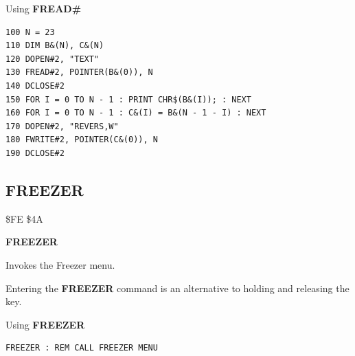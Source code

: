 \begin{description}[leftmargin=2cm,style=nextline]
\item [Example:]  Using {\bf FREAD\#}

\begin{tcolorbox}[colback=black,coltext=white]
\verbatimfont{\codefont}
\begin{verbatim}
100 N = 23
110 DIM B&(N), C&(N)
120 DOPEN#2, "TEXT"
130 FREAD#2, POINTER(B&(0)), N
140 DCLOSE#2
150 FOR I = 0 TO N - 1 : PRINT CHR$(B&(I)); : NEXT
160 FOR I = 0 TO N - 1 : C&(I) = B&(N - 1 - I) : NEXT
170 DOPEN#2, "REVERS,W"
180 FWRITE#2, POINTER(C&(0)), N
190 DCLOSE#2
\end{verbatim}
\end{tcolorbox}
\end{description}


\newpage
\subsection{FREEZER}
\begin{description}[leftmargin=2cm,style=nextline]
\item [Token:]    \$FE \$4A

\item [Format:]   {\bf FREEZER}

\item [Usage:]    Invokes the Freezer menu.

\item [Remarks:]  Entering the {\bf FREEZER} command is an alternative to holding and releasing the  key.

\item [Example:]  Using {\bf FREEZER}

\begin{tcolorbox}[colback=black,coltext=white]
\verbatimfont{\codefont}
\begin{verbatim}
FREEZER : REM CALL FREEZER MENU
\end{verbatim}
\end{tcolorbox}
\end{description}


\newpage
